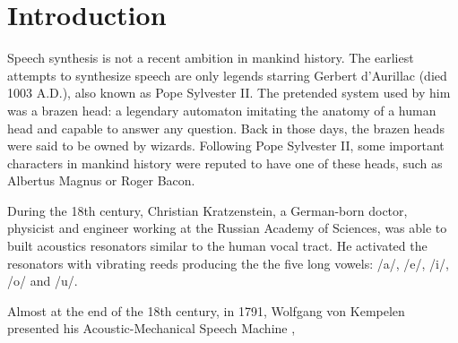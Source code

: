 \section{Introduction}
\label{intro}
\thispagestyle{empty}

Speech synthesis is not a recent ambition in mankind history. The earliest attempts to synthesize speech are only legends starring Gerbert d'Aurillac (died 1003 A.D.), also known as Pope Sylvester II. The pretended system used by him was a brazen head: a legendary automaton imitating the anatomy of a human head and capable to answer any question. Back in those days, the brazen heads were said to be owned by wizards. Following Pope Sylvester II, some important characters in mankind history  were reputed to have one of these heads, such as Albertus Magnus or Roger Bacon.

During the 18th century, Christian Kratzenstein, a German-born doctor, physicist and engineer working at the Russian Academy of Sciences, was able to built acoustics resonators similar to the human vocal tract. He activated the resonators with vibrating reeds producing the the five long vowels: /a/, /e/, /i/, /o/ and /u/.

Almost at the end of the 18th century, in 1791, Wolfgang von Kempelen presented his Acoustic-Mechanical Speech Machine \cite{vonKempelen}, 